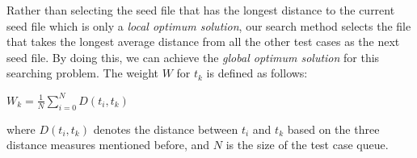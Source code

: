 Rather than selecting the seed file that has the longest distance to the current seed file which is only a \emph{local optimum solution}, our search method selects the file that takes the longest average distance from all the other test cases as the next seed file. By doing this, we can achieve the \emph{global optimum solution} for this searching problem. The weight $W$ for $t_k$ is defined as follows:

\begin{center}
$W_k = \displaystyle\frac{1}{N} \sum_{i=0}^{N} D(t_i, t_k)$
\end{center}

where $D(t_i, t_k)$ denotes the distance between $t_i$ and $t_k$ based on the three distance measures mentioned before, and $N$ is the size of the test case queue. 